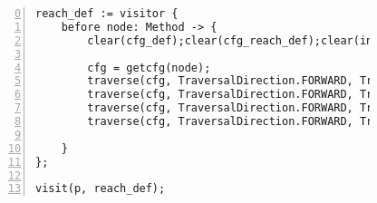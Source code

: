 \begin{figure}[ht!]
\begin{lstlisting}[numbers=left, tabsize=4, caption={Loop invariant code motion},label={lst:lic-code},firstline=0, firstnumber=0, lastline = 55]
reach_def := visitor {
	before node: Method -> {
		clear(cfg_def);clear(cfg_reach_def);clear(init);clear(loops);clear(codemotion);clear(loop_invariant);

		cfg = getcfg(node);
		traverse(cfg, TraversalDirection.FORWARD, TraversalKind.HYBRID, cfg_def);
		traverse(cfg, TraversalDirection.FORWARD, TraversalKind.HYBRID, init);
		traverse(cfg, TraversalDirection.FORWARD, TraversalKind.HYBRID, cfg_reach_def, fixp1);
		traverse(cfg, TraversalDirection.FORWARD, TraversalKind.HYBRID, loop_invariant);
			
	}
};

visit(p, reach_def);
\end{lstlisting}
\end{figure}